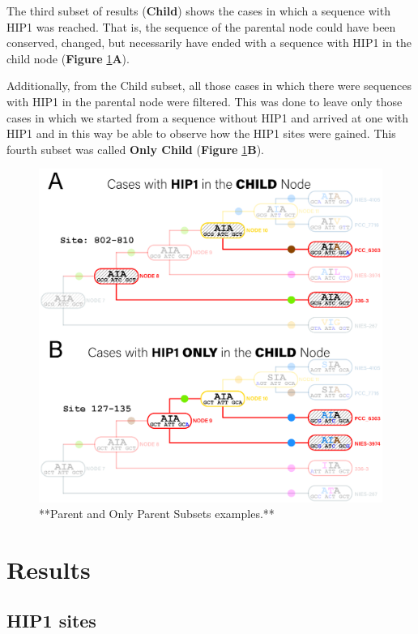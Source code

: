 \documentclass[
]{book}
\begin{document}
The third subset of results (\textbf{Child}) shows the cases in which a sequence with HIP1 was reached. That is, the sequence of the parental node could have been conserved, changed, but necessarily have ended with a sequence with HIP1 in the child node (\textbf{Figure} \ref{fig:FIG66x}\textbf{A}).

Additionally, from the Child subset, all those cases in which there were sequences with HIP1 in the parental node were filtered. This was done to leave only those cases in which we started from a sequence without HIP1 and arrived at one with HIP1 and in this way be able to observe how the HIP1 sites were gained. This fourth subset was called \textbf{Only Child} (\textbf{Figure} \ref{fig:FIG66x}\textbf{B}).

\begin{figure}
\includegraphics[width=1\linewidth]{figures/4x/Node_cases_B} \caption{**Parent and Only Parent Subsets examples.**}\label{fig:FIG66x}
\end{figure}

\hypertarget{results}{%
\chapter{Results}\label{results}}

\hypertarget{hip1-sites-1}{%
\section{HIP1 sites}\label{hip1-sites-1}}
\end{document}
